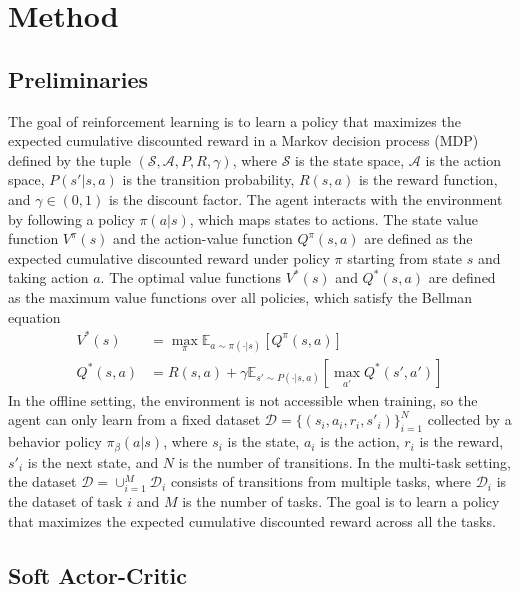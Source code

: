 \section{Method}
\label{sec:method}

\subsection{Preliminaries}

The goal of reinforcement learning is to learn a policy that maximizes the expected cumulative discounted reward in a Markov decision process (MDP) \cite{sutton1999reinforcement} defined by the tuple $(\mathcal{S}, \mathcal{A}, P, R, \gamma)$, where $\mathcal{S}$ is the state space, $\mathcal{A}$ is the action space, $P(s'|s, a)$ is the transition probability, $R(s, a)$ is the reward function, and $\gamma \in (0, 1)$ is the discount factor. The agent interacts with the environment by following a policy $\pi(a|s)$, which maps states to actions. The state value function $V^{\pi}(s)$ and the action-value function $Q^{\pi}(s, a)$ are defined as the expected cumulative discounted reward under policy $\pi$ starting from state $s$ and taking action $a$. The optimal value functions $V^*(s)$ and $Q^*(s, a)$ are defined as the maximum value functions over all policies, which satisfy the Bellman equation
\begin{equation}
    \begin{aligned}
        V^*(s) &= \max_{\pi} \mathbb{E}_{a \sim \pi(\cdot|s)} \left[ Q^{\pi}(s, a) \right] \\
        Q^*(s, a) &= R(s, a) + \gamma \mathbb{E}_{s' \sim P(\cdot|s, a)} \left[ \max_{a'} Q^*(s', a') \right]
    \end{aligned}
\end{equation}
In the offline setting, the environment is not accessible when training, so the agent can only learn from a fixed dataset $\mathcal{D} = \{(s_i, a_i, r_i, s'_i)\}_{i=1}^N$ collected by a behavior policy $\pi_{\beta}(a|s)$, where $s_i$ is the state, $a_i$ is the action, $r_i$ is the reward, $s'_i$ is the next state, and $N$ is the number of transitions. In the multi-task setting, the dataset $\mathcal{D}=\cup_{i=1}^M \mathcal{D}_i$ consists of transitions from multiple tasks, where $\mathcal{D}_i$ is the dataset of task $i$ and $M$ is the number of tasks. The goal is to learn a policy that maximizes the expected cumulative discounted reward across all the tasks.

\subsection{Soft Actor-Critic}


